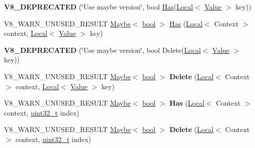\begin{DoxyCompactItemize}
\item 
\mbox{\label{classv8_1_1Object_a59c9f1b9c165ebce2b6fd93da171a539}} 
{\bfseries V8\+\_\+\+D\+E\+P\+R\+E\+C\+A\+T\+ED} (\char`\"{}Use maybe version\char`\"{}, bool \mbox{\hyperlink{classv8_1_1Object_a548a8d4329cf890be3698f1bff9b9837}{Has}}(\mbox{\hyperlink{classv8_1_1Local}{Local}}$<$ \mbox{\hyperlink{classv8_1_1Value}{Value}} $>$ key))
\item 
V8\+\_\+\+W\+A\+R\+N\+\_\+\+U\+N\+U\+S\+E\+D\+\_\+\+R\+E\+S\+U\+LT \mbox{\hyperlink{classv8_1_1Maybe}{Maybe}}$<$ \mbox{\hyperlink{classbool}{bool}} $>$ \mbox{\hyperlink{classv8_1_1Object_a548a8d4329cf890be3698f1bff9b9837}{Has}} (\mbox{\hyperlink{classv8_1_1Local}{Local}}$<$ Context $>$ context, \mbox{\hyperlink{classv8_1_1Local}{Local}}$<$ \mbox{\hyperlink{classv8_1_1Value}{Value}} $>$ key)
\item 
\mbox{\label{classv8_1_1Object_a1c2f3c464d543c4cf26a391adc34c98a}} 
{\bfseries V8\+\_\+\+D\+E\+P\+R\+E\+C\+A\+T\+ED} (\char`\"{}Use maybe version\char`\"{}, bool Delete(\mbox{\hyperlink{classv8_1_1Local}{Local}}$<$ \mbox{\hyperlink{classv8_1_1Value}{Value}} $>$ key))
\item 
\mbox{\label{classv8_1_1Object_a330eae8b92e0ad492edf4911b4a0fbf7}} 
V8\+\_\+\+W\+A\+R\+N\+\_\+\+U\+N\+U\+S\+E\+D\+\_\+\+R\+E\+S\+U\+LT \mbox{\hyperlink{classv8_1_1Maybe}{Maybe}}$<$ \mbox{\hyperlink{classbool}{bool}} $>$ {\bfseries Delete} (\mbox{\hyperlink{classv8_1_1Local}{Local}}$<$ Context $>$ context, \mbox{\hyperlink{classv8_1_1Local}{Local}}$<$ \mbox{\hyperlink{classv8_1_1Value}{Value}} $>$ key)
\item 
\mbox{\label{classv8_1_1Object_ad43b9cc6c5d147dbc91f137982ba934a}} 
V8\+\_\+\+W\+A\+R\+N\+\_\+\+U\+N\+U\+S\+E\+D\+\_\+\+R\+E\+S\+U\+LT \mbox{\hyperlink{classv8_1_1Maybe}{Maybe}}$<$ \mbox{\hyperlink{classbool}{bool}} $>$ {\bfseries Has} (\mbox{\hyperlink{classv8_1_1Local}{Local}}$<$ Context $>$ context, \mbox{\hyperlink{classuint32__t}{uint32\+\_\+t}} index)
\item 
\mbox{\label{classv8_1_1Object_a2800c9d64d2c685b8a1e698589233269}} 
V8\+\_\+\+W\+A\+R\+N\+\_\+\+U\+N\+U\+S\+E\+D\+\_\+\+R\+E\+S\+U\+LT \mbox{\hyperlink{classv8_1_1Maybe}{Maybe}}$<$ \mbox{\hyperlink{classbool}{bool}} $>$ {\bfseries Delete} (\mbox{\hyperlink{classv8_1_1Local}{Local}}$<$ Context $>$ context, \mbox{\hyperlink{classuint32__t}{uint32\+\_\+t}} index)

\end{DoxyCompactItemize}

